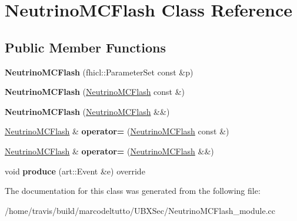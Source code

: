 \hypertarget{classNeutrinoMCFlash}{\section{\-Neutrino\-M\-C\-Flash \-Class \-Reference}
\label{classNeutrinoMCFlash}
}
\subsection*{\-Public \-Member \-Functions}
\begin{DoxyCompactItemize}
\item 
\hypertarget{classNeutrinoMCFlash_a924c91e62abb544113c57f337b792da0}{{\bfseries \-Neutrino\-M\-C\-Flash} (fhicl\-::\-Parameter\-Set const \&p)}\label{classNeutrinoMCFlash_a924c91e62abb544113c57f337b792da0}

\item 
\hypertarget{classNeutrinoMCFlash_a7d5c6482b7fe2e93af336474ee8fcce5}{{\bfseries \-Neutrino\-M\-C\-Flash} (\hyperlink{classNeutrinoMCFlash}{\-Neutrino\-M\-C\-Flash} const \&)}\label{classNeutrinoMCFlash_a7d5c6482b7fe2e93af336474ee8fcce5}

\item 
\hypertarget{classNeutrinoMCFlash_aff9006a646c5ab5adaaf7e856edb1576}{{\bfseries \-Neutrino\-M\-C\-Flash} (\hyperlink{classNeutrinoMCFlash}{\-Neutrino\-M\-C\-Flash} \&\&)}\label{classNeutrinoMCFlash_aff9006a646c5ab5adaaf7e856edb1576}

\item 
\hypertarget{classNeutrinoMCFlash_ac5dffc245c5f66a7622b5e5cb8c835f8}{\hyperlink{classNeutrinoMCFlash}{\-Neutrino\-M\-C\-Flash} \& {\bfseries operator=} (\hyperlink{classNeutrinoMCFlash}{\-Neutrino\-M\-C\-Flash} const \&)}\label{classNeutrinoMCFlash_ac5dffc245c5f66a7622b5e5cb8c835f8}

\item 
\hypertarget{classNeutrinoMCFlash_ad400da660762d0f8649fa868b13cc4e0}{\hyperlink{classNeutrinoMCFlash}{\-Neutrino\-M\-C\-Flash} \& {\bfseries operator=} (\hyperlink{classNeutrinoMCFlash}{\-Neutrino\-M\-C\-Flash} \&\&)}\label{classNeutrinoMCFlash_ad400da660762d0f8649fa868b13cc4e0}

\item 
\hypertarget{classNeutrinoMCFlash_a96fff468ffb1b1182b296d9bdab6d31b}{void {\bfseries produce} (art\-::\-Event \&e) override}\label{classNeutrinoMCFlash_a96fff468ffb1b1182b296d9bdab6d31b}

\end{DoxyCompactItemize}


\-The documentation for this class was generated from the following file\-:\begin{DoxyCompactItemize}
\item 
/home/travis/build/marcodeltutto/\-U\-B\-X\-Sec/\-Neutrino\-M\-C\-Flash\-\_\-module.\-cc\end{DoxyCompactItemize}
